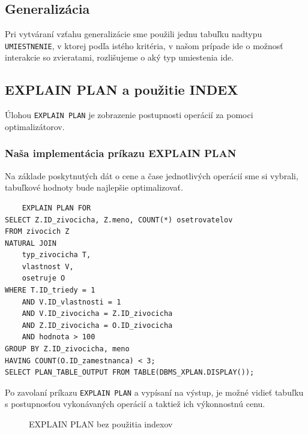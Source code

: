 \documentclass[a4paper, 11pt]{article}
\begin{document}
	\subsection{Generalizácia}
	Pri vytváraní vzťahu generalizácie sme použili jednu tabuľku nadtypu \texttt{UMIESTNENIE}, v ktorej podľa istého kritéria, v našom prípade ide o možnosť interakcie so zvieratami, rozlišujeme o aký typ umiestenia ide.
	\subsection{EXPLAIN PLAN a použitie INDEX}
    Úlohou \texttt{EXPLAIN PLAN} je zobrazenie postupnosti operácií za pomoci optimalizátorov.
        \subsubsection{Naša implementácia príkazu EXPLAIN PLAN}
    Na základe poskytnutých dát o cene a čase jednotlivých operácií sme si vybrali, tabuľkové hodnoty bude najlepšie optimalizovať.
    
    \begin{lstlisting}
    EXPLAIN PLAN FOR
SELECT Z.ID_zivocicha, Z.meno, COUNT(*) osetrovatelov
FROM zivocich Z
NATURAL JOIN
    typ_zivocicha T,
    vlastnost V,
    osetruje O
WHERE T.ID_triedy = 1
    AND V.ID_vlastnosti = 1
    AND V.ID_zivocicha = Z.ID_zivocicha
    AND Z.ID_zivocicha = O.ID_zivocicha
    AND hodnota > 100
GROUP BY Z.ID_zivocicha, meno
HAVING COUNT(O.ID_zamestnanca) < 3;
SELECT PLAN_TABLE_OUTPUT FROM TABLE(DBMS_XPLAN.DISPLAY());
    \end{lstlisting}
    Po zavolaní príkazu \texttt{EXPLAIN PLAN} a vypísaní na výstup, je možné vidieť tabuľku s postupnosťou vykonávaných operácií a taktiež ich výkonnostnú cenu.
	\begin{figure}[h]
	\centering
	\caption{EXPLAIN PLAN bez použitia indexov}
	\end{figure}
\newpage
\end{document}
